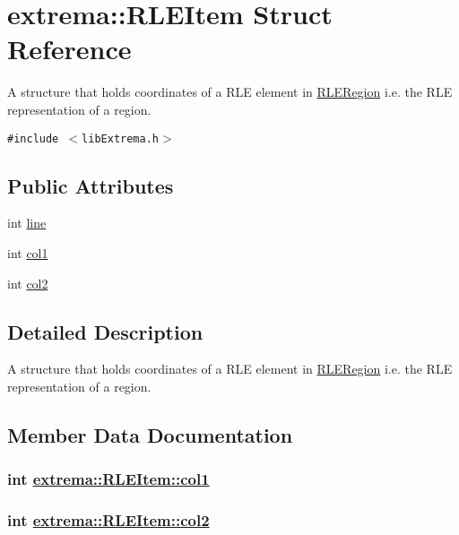 \hypertarget{structextrema_1_1RLEItem}{
\section{extrema::RLEItem Struct Reference}
\label{structextrema_1_1RLEItem}
}
A structure that holds coordinates of a RLE element in \hyperlink{structextrema_1_1RLERegion}{RLERegion} i.e. the RLE representation of a region.  


{\tt \#include $<$lib\-Extrema.h$>$}

\subsection*{Public Attributes}
\begin{CompactItemize}
\item 
int \hyperlink{structextrema_1_1RLEItem_2b94a01e8ce9bbff252d93283c490cd6}{line}
\item 
int \hyperlink{structextrema_1_1RLEItem_38185530a0f44066675db6801e09f8ee}{col1}
\item 
int \hyperlink{structextrema_1_1RLEItem_a490c644380a21d8cf7b34bfa73a304f}{col2}
\end{CompactItemize}


\subsection{Detailed Description}
A structure that holds coordinates of a RLE element in \hyperlink{structextrema_1_1RLERegion}{RLERegion} i.e. the RLE representation of a region. 



\subsection{Member Data Documentation}
\hypertarget{structextrema_1_1RLEItem_38185530a0f44066675db6801e09f8ee}{
\subsubsection[col1]{\setlength{\rightskip}{0pt plus 5cm}int \hyperlink{structextrema_1_1RLEItem_38185530a0f44066675db6801e09f8ee}{extrema::RLEItem::col1}}}
\label{structextrema_1_1RLEItem_38185530a0f44066675db6801e09f8ee}


\hypertarget{structextrema_1_1RLEItem_a490c644380a21d8cf7b34bfa73a304f}{
\subsubsection[col2]{\setlength{\rightskip}{0pt plus 5cm}int \hyperlink{structextrema_1_1RLEItem_a490c644380a21d8cf7b34bfa73a304f}{extrema::RLEItem::col2}}}
\label{structextrema_1_1RLEItem_a490c644380a21d8cf7b34bfa73a304f}


